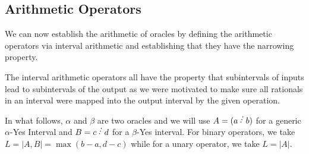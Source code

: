 \documentclass[12pt]{article}
\theoremstyle{remark}
\begin{document}
\subsection{Arithmetic Operators}

We can now establish the arithmetic of oracles by defining the arithmetic operators via interval arithmetic and establishing that they have the narrowing property.

The interval arithmetic operators all have the property that subintervals of inputs lead to subintervals of the output as we were motivated to make sure all rationals in an interval were mapped into the output interval by the given operation. 

In what follows, $\alpha$ and $\beta$ are two oracles and we will use $A=(a\lte b)$ for a generic $\alpha$-Yes Interval and $B=c\lte d$ for  a $\beta$-Yes interval. For binary operators, we take $L = |A,B| = \max(b-a, d-c)$ while for a unary operator, we take $L = |A|$. 
\end{document}
